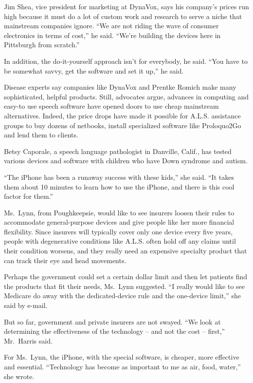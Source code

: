 ﻿\documentclass[12pt]{article}
\begin{document}
Jim Shea, vice president for marketing at DynaVox, says his company's prices run high because it
must do a lot of custom work and research to serve a niche that mainstream companies ignore. ``We
are not riding the wave of consumer electronics in terms of cost,'' he said. ``We're building the
devices here in Pittsburgh from scratch.''

In addition, the do-it-yourself approach isn't for everybody, he said. ``You have to be somewhat
savvy, get the software and set it up,'' he said.

Disease experts say companies like DynaVox and Prentke Romich make many sophisticated, helpful
products. Still, advocates argue, advances in computing and easy-to use speech software have opened
doors to use cheap mainstream alternatives. Indeed, the price drops have made it possible for A.L.S.
assistance groups to buy dozens of netbooks, install specialized software like Proloquo2Go and lend
them to clients.

Betsy Caporale, a speech language pathologist in Danville, Calif., has tested various devices and
software with children who have Down syndrome and autism.

``The iPhone has been a runaway success with these kids,'' she said. ``It takes them about 10
minutes to learn how to use the iPhone, and there is this cool factor for them.''

Ms.~Lynn, from Poughkeepsie, would like to see insurers loosen their rules to accommodate
general-purpose devices and give people like her more financial flexibility. Since insurers will
typically cover only one device every five years, people with degenerative conditions like A.L.S.
often hold off any claims until their condition worsens, and they really need an expensive specialty
product that can track their eye and head movements.

Perhaps the government could set a certain dollar limit and then let patients find the products that
fit their needs, Ms.~Lynn suggested. ``I really would like to see Medicare do away with the
dedicated-device rule and the one-device limit,'' she said by e-mail.

But so far, government and private insurers are not swayed. ``We look at determining the
effectiveness of the technology -- and not the cost -- first,'' Mr.~Harris said.

For Ms.~Lynn, the iPhone, with the special software, is cheaper, more effective and essential.
``Technology has become as important to me as air, food, water,'' she wrote.
\end{document}
